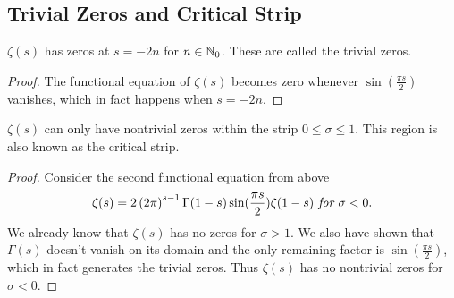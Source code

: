 \subsection{Trivial Zeros and Critical Strip}


\begin{corollary}
	$\zeta(s)$ has zeros at $s = -2n$ for $n \in \mathbb{N}_0$. These are called the trivial zeros.
\end{corollary}
\begin{proof}
	The functional equation of $\zeta(s)$ becomes zero whenever $\sin(\frac{\pi s}{2})$ vanishes, which in fact happens when $s = -2n$.
\end{proof}


\begin{corollary}
	$\zeta(s)$ can only have nontrivial zeros within the strip $0 \leq \sigma \leq 1$. This region is also known as the critical strip.
\end{corollary}
\begin{proof}
	Consider the second functional equation from above
\begin{equation*}
	\zeta(s) = 2\left(2 \pi\right)^{s-1} \Gamma(1 - s) \sin(\frac{\pi s}{2}) \zeta(1 - s) \textit{ for } \sigma < 0. 
\end{equation*}
	We already know that $\zeta(s)$ has no zeros for $\sigma > 1$. We also have shown that $\Gamma(s)$ doesn't vanish on its domain and the only remaining factor is $\sin(\frac{\pi s}{2})$, which in fact generates the trivial zeros. Thus $\zeta(s)$ has no nontrivial zeros for $\sigma < 0$.
\end{proof}